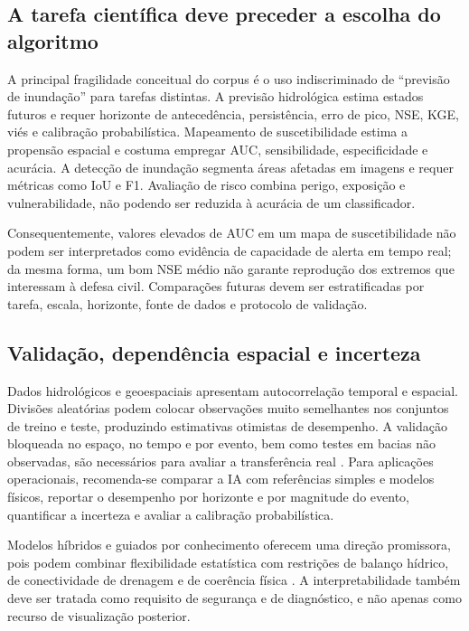 \subsection{A tarefa científica deve preceder a escolha do algoritmo}

A principal fragilidade conceitual do corpus é o uso indiscriminado de ``previsão de inundação'' para tarefas distintas. A previsão hidrológica estima estados futuros e requer horizonte de antecedência, persistência, erro de pico, NSE, KGE, viés e calibração probabilística. Mapeamento de suscetibilidade estima a propensão espacial e costuma empregar AUC, sensibilidade, especificidade e acurácia. A detecção de inundação segmenta áreas afetadas em imagens e requer métricas como IoU e F1. Avaliação de risco combina perigo, exposição e vulnerabilidade, não podendo ser reduzida à acurácia de um classificador.

Consequentemente, valores elevados de AUC em um mapa de suscetibilidade não podem ser interpretados como evidência de capacidade de alerta em tempo real; da mesma forma, um bom NSE médio não garante reprodução dos extremos que interessam à defesa civil. Comparações futuras devem ser estratificadas por tarefa, escala, horizonte, fonte de dados e protocolo de validação.

\subsection{Validação, dependência espacial e incerteza}

Dados hidrológicos e geoespaciais apresentam autocorrelação temporal e espacial. Divisões aleatórias podem colocar observações muito semelhantes nos conjuntos de treino e teste, produzindo estimativas otimistas de desempenho. A validação bloqueada no espaço, no tempo e por evento, bem como testes em bacias não observadas, são necessários para avaliar a transferência real \cite{roberts2017}. Para aplicações operacionais, recomenda-se comparar a IA com referências simples e modelos físicos, reportar o desempenho por horizonte e por magnitude do evento, quantificar a incerteza e avaliar a calibração probabilística.

Modelos híbridos e guiados por conhecimento oferecem uma direção promissora, pois podem combinar flexibilidade estatística com restrições de balanço hídrico, de conectividade de drenagem e de coerência física \cite{nearing2021}. A interpretabilidade também deve ser tratada como requisito de segurança e de diagnóstico, e não apenas como recurso de visualização posterior.

